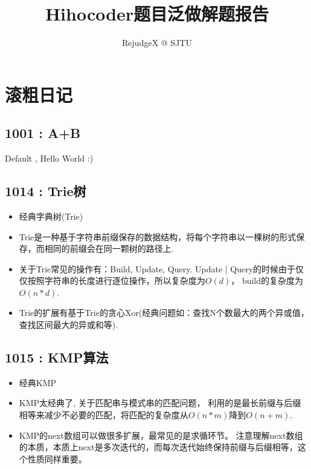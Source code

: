 \documentclass{article}
\title{Hihocoder题目泛做解题报告}
\author{RejudgeX @ SJTU}
\begin{document}
\begin{titlepage}
\maketitle
\thispagestyle{empty}
\pagebreak
\pagestyle{plain}
\tableofcontents
\end{titlepage}
\section{滚粗日记}

\subsection{1001 : A+B}
Default , Hello World :)


\subsection{1014 : Trie树}
\begin{itemize}
\item 经典字典树(Trie)
\item Trie是一种基于字符串前缀保存的数据结构，将每个字符串以一棵树的形式保存，而相同的前缀会在同一颗树的路径上.
\item 关于Trie常见的操作有：Build, Update, Query. Update | Query的时候由于仅仅按照字符串的长度进行逐位操作，所以复杂度为$O(d)$， build的复杂度为$O(n*d)$.
\item Trie的扩展有基于Trie的贪心Xor(经典问题如：查找N个数最大的两个异或值， 查找区间最大的异或和等).
\end{itemize}



\subsection{1015 : KMP算法}
\begin{itemize}
\item 经典KMP
\item KMP太经典了, 关于匹配串与模式串的匹配问题， 利用的是最长前缀与后缀相等来减少不必要的匹配，将匹配的复杂度从$O(n*m)$降到$O(n+m)$.
\item KMP的next数组可以做很多扩展，最常见的是求循环节。 注意理解next数组的本质，本质上next是多次迭代的，而每次迭代始终保持前缀与后缀相等，这个性质同样重要。
\end{itemize}

\end{document}
